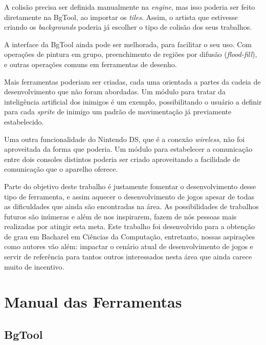 \documentclass[brazil]{abnt}
\begin{document}
A colisão precisa ser definida manualmente na \textit{engine}, mas isso poderia ser feito diretamente na BgTool, ao importar os \textit{tiles}. Assim, o artista que estivesse criando os \textit{backgrounds} poderia já escolher o tipo de colisão dos seus trabalhos.

A interface da BgTool ainda pode ser melhorada, para facilitar o seu uso. Com operações de pintura em grupo, preenchimento de regiões por difusão (\textit{flood-fill}), e outras operações comuns em ferramentas de desenho.

Mais ferramentas poderiam ser criadas, cada uma orientada a partes da cadeia de desenvolvimento que não foram abordadas. Um módulo para tratar da inteligência artificial dos inimigos é um exemplo, possibilitando o usuário a definir para cada \textit{sprite} de inimigo um padrão de movimentação já previamente estabelecido.

Uma outra funcionalidade do Nintendo DS, que é a conexão \textit{wireless}, não foi aproveitada da forma que poderia. Um módulo para estabelecer a comunicação entre dois consoles distintos poderia ser criado aproveitando a facilidade de comunicação que o aparelho oferece.

Parte do objetivo deste trabalho é justamente fomentar o desenvolvimento desse tipo de ferramenta, e assim aquecer o desenvolvimento de jogos apesar de todas as dificuldades que ainda são encontradas na área. As possibilidades de trabalhos futuros são inúmeras e além de nos inspirarem, fazem de nós pessoas mais realizadas por atingir esta meta. Este trabalho foi desenvolvido para a obtenção de grau em Bacharel em Ciências da Computação, entretanto, nossas aspirações como autores vão além: impactar o cenário atual de desenvolvimento de jogos e servir de referência para tantos outros interessados nesta área que ainda carece muito de incentivo.





\anexo

\chapter{Manual das Ferramentas}

\section{BgTool}
\end{document}
